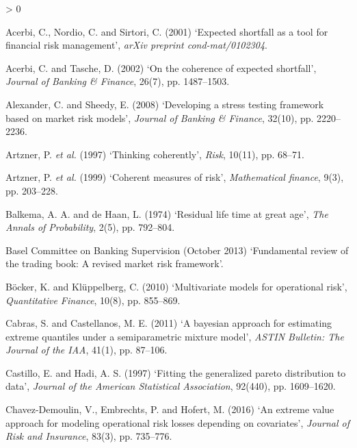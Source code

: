 \documentclass[a4paper,11pt]{article}
\newlength{\cslhangindent}
\newenvironment{CSLReferences}[2] %
 {%
  \setlength{\parindent}{0pt}
  \ifodd #1 \everypar{\setlength{\hangindent}{\cslhangindent}}\ignorespaces\fi
  \ifnum #2 > 0
  \setlength{\parskip}{#2\baselineskip}
  \fi
 }%
 {}
\theoremstyle{definition}
\theoremstyle{definition}
\theoremstyle{definition}
\theoremstyle{definition}
\theoremstyle{remark}
\begin{document}
\hypertarget{refs}{}
\begin{CSLReferences}{0}{0}
\leavevmode\hypertarget{ref-acerbi2001expected}{}%
Acerbi, C., Nordio, C. and Sirtori, C. (2001) {`Expected shortfall as a tool for financial risk management'}, \emph{arXiv preprint cond-mat/0102304}.

\leavevmode\hypertarget{ref-acerbi2002coherence}{}%
Acerbi, C. and Tasche, D. (2002) {`On the coherence of expected shortfall'}, \emph{Journal of Banking \& Finance}, 26(7), pp. 1487--1503.

\leavevmode\hypertarget{ref-alexander2008developing}{}%
Alexander, C. and Sheedy, E. (2008) {`Developing a stress testing framework based on market risk models'}, \emph{Journal of Banking \& Finance}, 32(10), pp. 2220--2236.

\leavevmode\hypertarget{ref-artzner1997thinking}{}%
Artzner, P. \emph{et al.} (1997) {`Thinking coherently'}, \emph{Risk}, 10(11), pp. 68--71.

\leavevmode\hypertarget{ref-artzner1999coherent}{}%
Artzner, P. \emph{et al.} (1999) {`Coherent measures of risk'}, \emph{Mathematical finance}, 9(3), pp. 203--228.

\leavevmode\hypertarget{ref-10.2307ux2f2959306}{}%
Balkema, A. A. and de Haan, L. (1974) {`Residual life time at great age'}, \emph{The Annals of Probability}, 2(5), pp. 792--804.

\leavevmode\hypertarget{ref-basel2013}{}%
Basel Committee on Banking Supervision (October 2013) {`Fundamental review of the trading book: A revised market risk framework'}.

\leavevmode\hypertarget{ref-bocker2010multivariate}{}%
Böcker, K. and Klüppelberg, C. (2010) {`Multivariate models for operational risk'}, \emph{Quantitative Finance}, 10(8), pp. 855--869.

\leavevmode\hypertarget{ref-cabras2011bayesian}{}%
Cabras, S. and Castellanos, M. E. (2011) {`A bayesian approach for estimating extreme quantiles under a semiparametric mixture model'}, \emph{ASTIN Bulletin: The Journal of the IAA}, 41(1), pp. 87--106.

\leavevmode\hypertarget{ref-castillo1997fitting}{}%
Castillo, E. and Hadi, A. S. (1997) {`Fitting the generalized pareto distribution to data'}, \emph{Journal of the American Statistical Association}, 92(440), pp. 1609--1620.

\leavevmode\hypertarget{ref-chavez2016extreme}{}%
Chavez-Demoulin, V., Embrechts, P. and Hofert, M. (2016) {`An extreme value approach for modeling operational risk losses depending on covariates'}, \emph{Journal of Risk and Insurance}, 83(3), pp. 735--776.


\end{CSLReferences}
\end{document}
